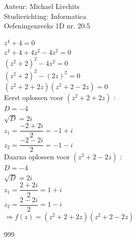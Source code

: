 \documentclass[a4paper]{article}
\begin{document}
  
\noindent \large Auteur: Michael Livchits \\
\noindent \large Studierichting: Informatica\\
\noindent \large Oefeningenreeks 1D nr. 20.5\\

\medskip

\normalsize

$z^4 + 4 = 0$\\

$z^4 + 4 + 4z^2 - 4z^2 = 0$\\

$(z^2+2)^2 - 4z^2 = 0$\\

$(z^2+2)^2 - (2z)^2 = 0$\\

$(z^2+2+2z)(z^2+2-2z) = 0$\\

Eerst oplossen voor $(z^2+2+2z)$ :\\

$D = -4$\\

$\sqrt{D} = 2i$\\

$z_1 = \dfrac{-2+2i}{2} = -1 + i$\\

$z_2 = \dfrac{-2-2i}{2} = -1 - i$\\

Daarna oplossen voor $(z^2+2-2z)$ :\\

$D = -4$\\

$\sqrt{D} = 2i$\\

$z_1 = \dfrac{2+2i}{2} = 1 + i$\\

$z_2 = \dfrac{2-2i}{2} = 1 - i$\\

$\Rightarrow f(z) = (z^2+2+2z)(z^2+2-2z)$ \\

\begin{thebibliography}{999}
\end{thebibliography}
\end{document}
